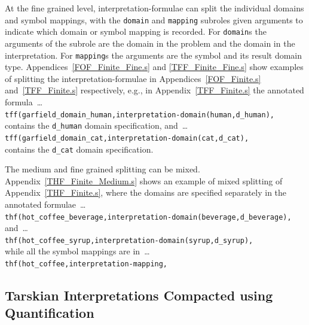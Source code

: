 \documentclass{easychair}
\newcommand{\smalltt}[1]{\small \texttt{#1}}
\begin{document}
At the fine grained level, interpretation-formulae can split the individual domains and symbol 
mappings, with the {\tt domain} and {\tt mapping} subroles given arguments to indicate
which domain or symbol mapping is recorded.
For {\tt domain}s the arguments of the subrole are the domain in the problem and the domain in the 
interpretation.
For {\tt mapping}s the arguments are the symbol and its result domain type.
Appendices~\ref{FOF_Finite_Fine.s} and \ref{TFF_Finite_Fine.s} show examples of splitting the 
interpretation-formulae in Appendices~\ref{FOF_Finite.s} and~\ref{TFF_Finite.s} respectively, 
e.g., in Appendix~\ref{TFF_Finite.s} the annotated formula~\ldots \\
\hspace*{1.0em}\smalltt{tff(garfield\_domain\_human,interpretation-domain(human,d\_human),} \\
contains the {\tt d\_human} domain specification, and~\ldots \\
\hspace*{1.0em}\smalltt{tff(garfield\_domain\_cat,interpretation-domain(cat,d\_cat),} \\
contains the {\tt d\_cat} domain specification.

The medium and fine grained splitting can be mixed.
Appendix~\ref{THF_Finite_Medium.s} shows an example of mixed splitting of 
Appendix~\ref{THF_Finite.s}, where the domains are specified separately in the annotated
formulae~\ldots \\
\hspace*{1.0em}\smalltt{thf(hot\_coffee\_beverage,interpretation-domain(beverage,d\_beverage),} \\
and~\ldots \\
\hspace*{1.0em}\smalltt{thf(hot\_coffee\_syrup,interpretation-domain(syrup,d\_syrup),} \\
while all the symbol mappings are in~\ldots \\
\hspace*{1.0em}\smalltt{thf(hot\_coffee,interpretation-mapping,}

\subsection{Tarskian Interpretations Compacted using Quantification}
\label{NewTarskianCompact}
\end{document}
